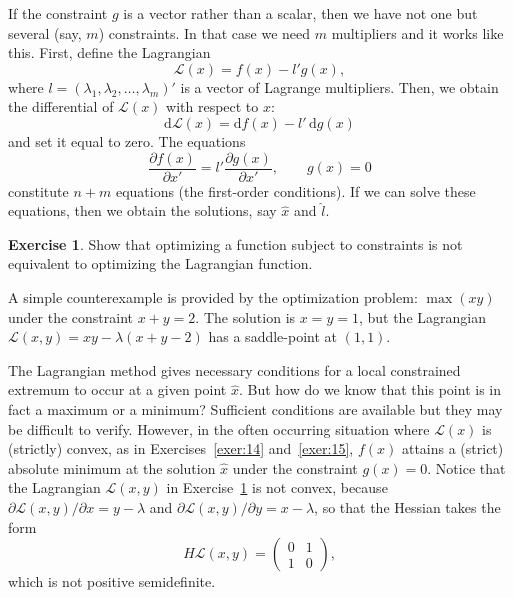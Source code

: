 \documentclass[12pt,a4paper]{article}
\makeatletter
\theoremstyle{definition}
\newtheorem{exercise}{Exercise}
\renewenvironment{proof}[1][\proofname]{\par
  \pushQED{\qed}%
  \normalfont \topsep6\p@\@plus6\p@\relax
  \trivlist
  \item[\hskip\labelsep\bfseries #1\@addpunct{.}]\ignorespaces
}{%
  \popQED\endtrivlist\@endpefalse
}
\newenvironment{solution}{%
  \begin{proof}[Solution]%
}{%
  \end{proof}%
}
\newcommand{\dd}{\mathrm{d}}
\makeatother
\begin{document}
If the constraint $g$ is a vector rather than a scalar, then we have not one but several (say, $m$) constraints. In that case we need $m$ multipliers and it works like this. First, define the Lagrangian
\begin{equation}\label{eq:23}
\mathcal{L}(x) = f(x) - l' g(x),
\end{equation}
where $l = (\lambda_1, \lambda_2, \dots, \lambda_m)'$ is a vector of Lagrange multipliers. Then, we obtain the differential of $\mathcal{L}(x)$ with respect to $x$:
\begin{equation}\label{eq:24}
\dd\mathcal{L}(x) = \dd f(x) - l'\, \dd g(x)
\end{equation}
and set it equal to zero. %
The equations
\begin{equation}\label{eq:25}
\frac{\partial f(x)}{\partial x'} = l' \frac{\partial g(x)}{\partial x'}, \qquad g(x) = 0
\end{equation}
constitute $n + m$ equations (the first-order conditions). If we can solve these equations, then we obtain the solutions, say $\hat{x}$ and $\hat{l}$. %

\begin{exercise}\label{exer:16}
Show that optimizing a function subject to constraints is not equivalent to optimizing the Lagrangian function.
\end{exercise}

\begin{solution}
A simple counterexample is provided by the optimization problem: $\max(xy)$ under the constraint $x + y = 2$. The solution is $x = y = 1$, but the Lagrangian $\mathcal{L}(x, y) = xy - \lambda(x + y - 2)$ has a saddle-point at $(1, 1)$. %
\end{solution}

The Lagrangian method gives necessary conditions for a local constrained extremum to occur at a given point $\hat{x}$. But how do we know that this point is in fact a maximum or a minimum? Sufficient conditions are available but they may be difficult to verify. However, in the often occurring situation where $\mathcal{L}(x)$ is (strictly) convex, as in Exercises~\ref{exer:14} and~\ref{exer:15}, $f(x)$ attains a (strict) absolute minimum at the solution $\hat{x}$ under the constraint $g(x) = 0$. %
Notice that the Lagrangian $\mathcal{L}(x,y)$ in Exercise~\ref{exer:16} is not convex, because $\partial \mathcal{L}(x,y)/\partial x = y - \lambda$ and $\partial \mathcal{L}(x,y)/\partial y = x - \lambda$, so that the Hessian takes the form
\[
H\mathcal{L}(x,y) = \begin{pmatrix} 0 & 1 \\ 1 & 0 \end{pmatrix},
\]
which is not positive semidefinite. %
\end{document}

